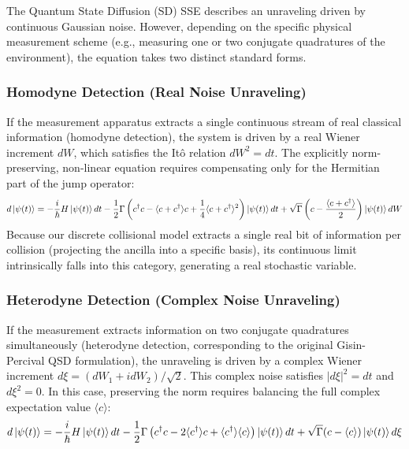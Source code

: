 \documentclass[a4paper,12pt]{article}
\begin{document}
	The Quantum State Diffusion (SD) SSE describes an unraveling driven by continuous Gaussian noise. However, depending on the specific physical measurement scheme (e.g., measuring one or two conjugate quadratures of the environment), the equation takes two distinct standard forms.
	
	\subsubsection*{Homodyne Detection (Real Noise Unraveling)}
	
	If the measurement apparatus extracts a single continuous stream of real classical information (homodyne detection), the system is driven by a real Wiener increment $dW$, which satisfies the It\^o relation $dW^2 = dt$. The explicitly norm-preserving, non-linear equation requires compensating only for the Hermitian part of the jump operator:
	\begin{equation}
		d\ket{\psi(t)} = -\frac{i}{\hbar}H\ket{\psi(t)}dt - \frac{1}{2}\Gamma\left(c^\dagger c - \langle c + c^\dagger \rangle c + \frac{1}{4}\langle c + c^\dagger \rangle^2 \right)\ket{\psi(t)}dt + \sqrt{\Gamma}\left(c - \frac{\langle c + c^\dagger \rangle}{2}\right)\ket{\psi(t)}dW
		\label{eq:SD_homodyne}
	\end{equation}
	Because our discrete collisional model extracts a single real bit of information per collision (projecting the ancilla into a specific basis), its continuous limit intrinsically falls into this category, generating a real stochastic variable.
	
	\subsubsection*{Heterodyne Detection (Complex Noise Unraveling)}
	
	If the measurement extracts information on two conjugate quadratures simultaneously (heterodyne detection, corresponding to the original Gisin-Percival QSD formulation), the unraveling is driven by a complex Wiener increment $d\xi = (dW_1 + i dW_2)/\sqrt{2}$. This complex noise satisfies $|d\xi|^2 = dt$ and $d\xi^2 = 0$. In this case, preserving the norm requires balancing the full complex expectation value $\langle c \rangle$:
	\begin{equation}
		d\ket{\psi(t)} = -\frac{i}{\hbar} H \ket{\psi(t)} dt - \frac{1}{2} \Gamma \left( c^\dagger c - 2\langle c^\dagger \rangle c + \langle c^\dagger \rangle \langle c \rangle \right) \ket{\psi(t)} dt + \sqrt{\Gamma} (c - \langle c \rangle) \ket{\psi(t)} d\xi
		\label{eq:SD_heterodyne}
	\end{equation}
	
\end{document}
